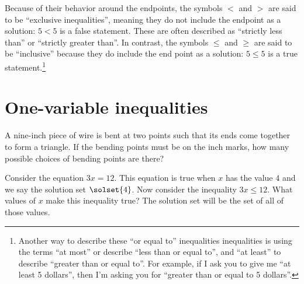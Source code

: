 Because of their behavior around the endpoints, the symbols $<$ and $>$ are said to be ``exclusive inequalities'', meaning they do not include the endpoint as a solution: $5<5$ is a false statement. These are often described as ``strictly less than'' or ``strictly greater than''. In contrast, the symbols $\leq$ and $\geq$ are said to be ``inclusive'' because they do include the end point as a solution: $5 \leq 5$ is a true statement.\footnote{Another way to describe these ``or equal to'' inequalities inequalities is using the terms ``at most'' or describe ``less than or equal to'', and ``at least'' to describe ``greater than or equal to''. For example, if I ask you to give me ``at least 5 dollars'', then I'm asking you for ``greater than or equal to 5 dollars''.}

%
%
%

\section{One-variable inequalities}
\label{sec:ineqonevar}

\begin{boxedexplore}
A nine-inch piece of wire is bent at two points such that its ends come together to form a triangle. If the bending points must be on the inch marks, how many possible choices of bending points are there?
\end{boxedexplore}

Consider the equation $3x = 12$. This equation is true when $x$ has the value $4$ and we say the solution set $\solset{4}$. Now consider the inequality $3x \leq 12$. What values of $x$ make this inequality true? The solution set will be the set of all of those values. 

